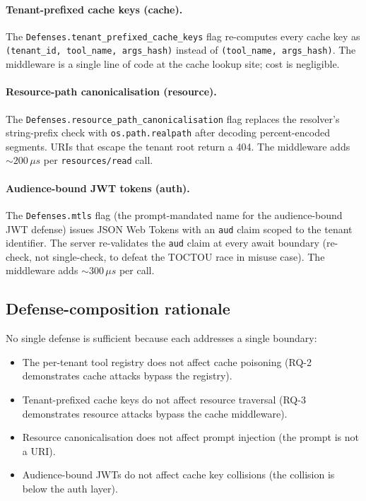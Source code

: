 \paragraph{Tenant-prefixed cache keys (cache).} The
\texttt{Defenses.tenant\_prefixed\_cache\_keys} flag
re-computes every cache key as
\texttt{(tenant\_id, tool\_name, args\_hash)} instead of
\texttt{(tool\_name, args\_hash)}. The middleware is a single
line of code at the cache lookup site; cost is negligible.

\paragraph{Resource-path canonicalisation (resource).} The
\texttt{Defenses.resource\_path\_canonicalisation} flag
replaces the resolver's string-prefix check with
\texttt{os.path.realpath} after decoding percent-encoded
segments. URIs that escape the tenant root return a 404. The
middleware adds $\sim 200\,\mu s$ per
\texttt{resources/read} call.

\paragraph{Audience-bound JWT tokens (auth).} The
\texttt{Defenses.mtls} flag (the prompt-mandated name for the
audience-bound JWT defense) issues JSON Web Tokens with an
\texttt{aud} claim scoped to the tenant identifier. The
server re-validates the \texttt{aud} claim at every await
boundary (re-check, not single-check, to defeat the
TOCTOU race in misuse case). The middleware adds $\sim
300\,\mu s$ per call.

\subsection{Defense-composition rationale}

No single defense is sufficient because each addresses a
single boundary:

\begin{itemize}
  \item The per-tenant tool registry does not affect cache
        poisoning (RQ-2 demonstrates cache attacks bypass
        the registry).
  \item Tenant-prefixed cache keys do not affect resource
        traversal (RQ-3 demonstrates resource attacks bypass
        the cache middleware).
  \item Resource canonicalisation does not affect prompt
        injection (the prompt is not a URI).
  \item Audience-bound JWTs do not affect cache key
        collisions (the collision is below the auth layer).
\end{itemize}

